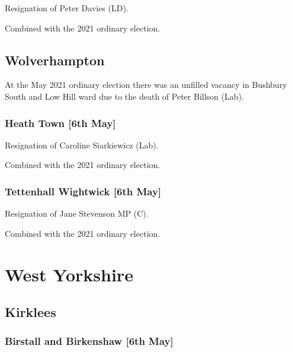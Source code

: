 \documentclass[a4paper,openany]{book}
\begin{document}
\begin{resultsiii}
Resignation of Peter Davies (LD).

Combined with the 2021 ordinary election.

\subsection*{Wolverhampton}

At the May 2021 ordinary election there was an unfilled vacancy in Bushbury South and Low Hill ward due to the death of Peter Billson (Lab).

\subsubsection*{Heath Town \hspace*{\fill}\nolinebreak[1]%
	\enspace\hspace*{\fill}
	[6th May]}


Resignation of Caroline Siarkiewicz (Lab).

Combined with the 2021 ordinary election.

\subsubsection*{Tettenhall Wightwick \hspace*{\fill}\nolinebreak[1]%
	\enspace\hspace*{\fill}
	[6th May]}


Resignation of Jane Stevenson MP (C).

Combined with the 2021 ordinary election.

\section{West Yorkshire}

\subsection*{Kirklees}

\subsubsection*{Birstall and Birkenshaw \hspace*{\fill}\nolinebreak[1]%
	\enspace\hspace*{\fill}
	[6th May]}


\end{resultsiii}
\end{document}
